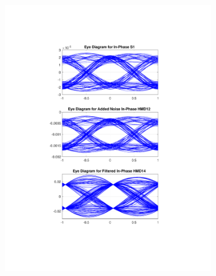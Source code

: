 \begin{figure}[H]
	\centering
	\begin{subfigure}{.45\textwidth}
		\centering
		\includegraphics[clip, trim=5cm 4cm 5cm 4cm, width=\textwidth]{./sdf/m_qam_system/figures/eyes/if_nn_p_60_03.pdf}
	\end{subfigure}
	\begin{subfigure}{.45\textwidth}
		\centering

\end{subfigure}
\end{figure}
